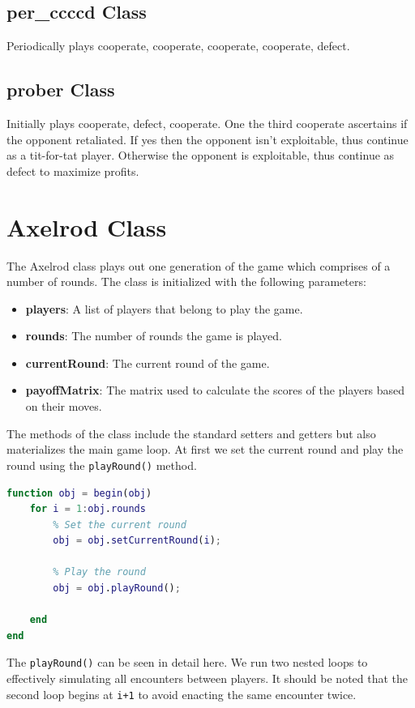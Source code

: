 \documentclass[12pt]{article}
\begin{document}
\subsection{per\_ccccd Class}
Periodically plays cooperate, cooperate, cooperate, cooperate, defect.
\subsection{prober Class}
Initially plays cooperate, defect, cooperate. One the third cooperate ascertains if the opponent retaliated. If yes then the opponent isn't exploitable, thus continue as a tit-for-tat player. Otherwise the opponent is exploitable, thus continue as defect to maximize profits.

\section{Axelrod Class}
The Axelrod class plays out one generation of the game which comprises of a number of rounds. The class is initialized with the following parameters:
\begin{itemize}
    \item \textbf{players}: A list of players that belong to  play the game.
    \item \textbf{rounds}: The number of rounds the game is played.
    \item \textbf{currentRound}: The current round of the game.
    \item \textbf{payoffMatrix}: The matrix used to calculate the scores of the players based on their moves.
\end{itemize}
The methods of the class include the standard setters and getters but also materializes the main game loop. At first we set the current round and play the round using the \texttt{playRound()} method.
\begin{lstlisting}[language=Matlab, caption={Full Rounding Logic Implementation}]
% Method to play the tournament
function obj = begin(obj)
    for i = 1:obj.rounds
        % Set the current round
        obj = obj.setCurrentRound(i);

        % Play the round
        obj = obj.playRound();

    end
end
\end{lstlisting}

The \texttt{playRound()} can be seen in detail here. We run two nested loops to effectively simulating all encounters between players. It should be noted that the second loop begins at \texttt{i+1} to avoid enacting the same encounter twice.
\end{document}
